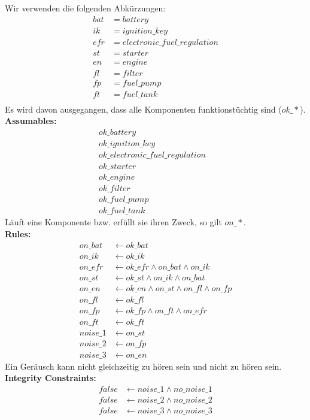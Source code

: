 \documentclass[a4paper]{scrartcl}
\begin{document}
Wir verwenden die folgenden Abkürzungen:
\begin{align*}
    bat &= battery \\
    ik &= ignition\_key \\
    efr &= electronic\_fuel\_regulation \\
    st &= starter \\
    en &= engine \\
    fl &= filter \\
    fp &= fuel\_pump \\
    ft &= fuel\_tank \\
\end{align*}
Es wird davon ausgegangen, dass alle Komponenten funktionstüchtig sind ($ok\_\ast$). \\
\textbf{Assumables:}
\begin{align*}
    ok\_battery & \\
    ok\_ignition\_key & \\
    ok\_electronic\_fuel\_regulation & \\
    ok\_starter & \\
    ok\_engine & \\
    ok\_filter & \\
    ok\_fuel\_pump & \\
    ok\_fuel\_tank &
\end{align*}
Läuft eine Komponente bzw. erfüllt sie ihren Zweck, so gilt $on\_\ast$. \\
\textbf{Rules:}
\begin{align*}
    on\_bat &\leftarrow ok\_bat \\
    on\_ik &\leftarrow ok\_ik \\
    on\_efr &\leftarrow ok\_efr \land on\_bat \land on\_ik \\
    on\_st &\leftarrow ok\_st \land on\_ik \land on\_bat \\
    on\_en &\leftarrow ok\_en \land on\_st \land on\_fl \land on\_fp \\
    on\_fl &\leftarrow ok\_fl \\
    on\_fp &\leftarrow ok\_fp \land on\_ft \land on\_efr \\
    on\_ft &\leftarrow ok\_ft \\
    noise\_1 &\leftarrow on\_st \\
    noise\_2 &\leftarrow on\_fp \\
    noise\_3 &\leftarrow on\_en
\end{align*}
Ein Geräusch kann nicht gleichzeitig zu hören sein und nicht zu hören sein. \\
\textbf{Integrity Constraints:}
\begin{align*}
    false &\leftarrow noise\_1 \land no\_noise\_1 \\
    false &\leftarrow noise\_2 \land no\_noise\_2 \\
    false &\leftarrow noise\_3 \land no\_noise\_3
\end{align*}
\end{document}
